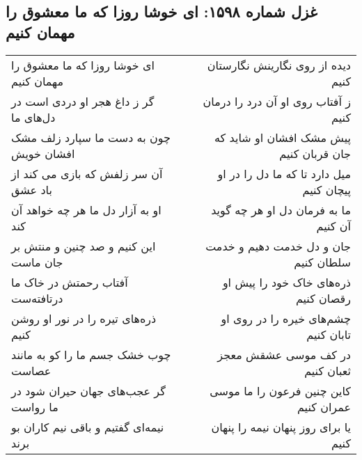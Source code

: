 \begin{center}
\section*{غزل شماره ۱۵۹۸: ای خوشا روزا که ما معشوق را مهمان کنیم}
\label{sec:1598}
\begin{longtable}{l p{0.5cm} r}
ای خوشا روزا که ما معشوق را مهمان کنیم
&&
دیده از روی نگارینش نگارستان کنیم
\\
گر ز داغ هجر او دردی است در دل‌های ما
&&
ز آفتاب روی او آن درد را درمان کنیم
\\
چون به دست ما سپارد زلف مشک افشان خویش
&&
پیش مشک افشان او شاید که جان قربان کنیم
\\
آن سر زلفش که بازی می کند از باد عشق
&&
میل دارد تا که ما دل را در او پیچان کنیم
\\
او به آزار دل ما هر چه خواهد آن کند
&&
ما به فرمان دل او هر چه گوید آن کنیم
\\
این کنیم و صد چنین و منتش بر جان ماست
&&
جان و دل خدمت دهیم و خدمت سلطان کنیم
\\
آفتاب رحمتش در خاک ما درتافته‌ست
&&
ذره‌های خاک خود را پیش او رقصان کنیم
\\
ذره‌های تیره را در نور او روشن کنیم
&&
چشم‌های خیره را در روی او تابان کنیم
\\
چوب خشک جسم ما را کو به مانند عصاست
&&
در کف موسی عشقش معجز ثعبان کنیم
\\
گر عجب‌های جهان حیران شود در ما رواست
&&
کاین چنین فرعون را ما موسی عمران کنیم
\\
نیمه‌ای گفتیم و باقی نیم کاران بو برند
&&
یا برای روز پنهان نیمه را پنهان کنیم
\\
\end{longtable}
\end{center}
